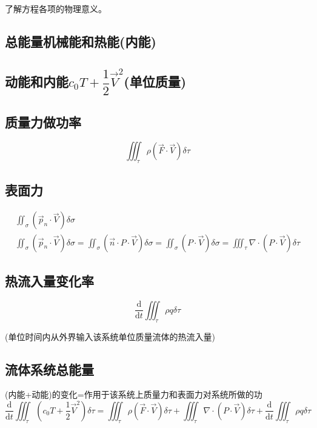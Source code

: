 \documentclass[a4paper,oneside]{ctexbook}
\begin{document}
了解方程各项的物理意义。

\subsection{总能量机械能和热能(内能)}

\subsection{动能和内能\(c_0T+\dfrac{1}{2}\overrightarrow{V}^2\)(单位质量)}

\subsection{质量力做功率}\begin{equation}\iiint_\tau\rho(\overrightarrow{F}\cdot\overrightarrow{V})\delta\tau\end{equation}

\subsection{表面力}
\begin{gather}
    \iint_\sigma(\overrightarrow{p}_n\cdot\overrightarrow{V})\delta\sigma\\
    \iint_\sigma(\overrightarrow{p}_n\cdot\overrightarrow{V})\delta\sigma=\iint_\sigma(\overrightarrow{n}\cdot{P}\cdot\overrightarrow{V})\delta\sigma=\iint_\sigma(P\cdot\overrightarrow{V})\delta\sigma=\iiint_\tau\nabla\cdot(P\cdot\overrightarrow{V})\delta\tau
\end{gather}

\subsection{热流入量变化率}
\begin{equation}
    \dfrac{\mathrm{d}}{\mathrm{d}t}\iiint_\tau\rho{q}\delta\tau
\end{equation}

(单位时间内从外界输入该系统单位质量流体的热流入量)

\subsection{流体系统总能量}

(内能+动能)的变化=作用于该系统上质量力和表面力对系统所做的功
\begin{equation}
    \dfrac{\mathrm{d}}{\mathrm{d}t}\iiint_\tau(c_0T+\dfrac{1}{2}\overrightarrow{V}^2)\delta\tau=\iiint_\tau\rho(\overrightarrow{F}\cdot\overrightarrow{V})\delta\tau+\iiint_\tau\nabla\cdot(P\cdot\overrightarrow{V})\delta\tau+\dfrac{\mathrm{d}}{\mathrm{d}t}\iiint_\tau\rho{q}\delta\tau\label{eqa:eg}
\end{equation}
\end{document}
